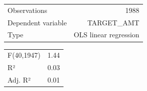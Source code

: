 \documentclass[]{article}
\begin{document}
\begin{table}[!h]
\centering
\begin{tabular}{lr}
\toprule
\rowcolor{gray!6}  Observations & 1988\\
Dependent variable & TARGET\_AMT\\
\rowcolor{gray!6}  Type & OLS linear regression\\
\bottomrule
\end{tabular}
\end{table}

\begin{table}[!h]
\centering
\begin{tabular}{lr}
\toprule
\rowcolor{gray!6}  F(40,1947) & 1.44\\
R² & 0.03\\
\rowcolor{gray!6}  Adj. R² & 0.01\\
\bottomrule
\end{tabular}
\end{table}
\end{document}
